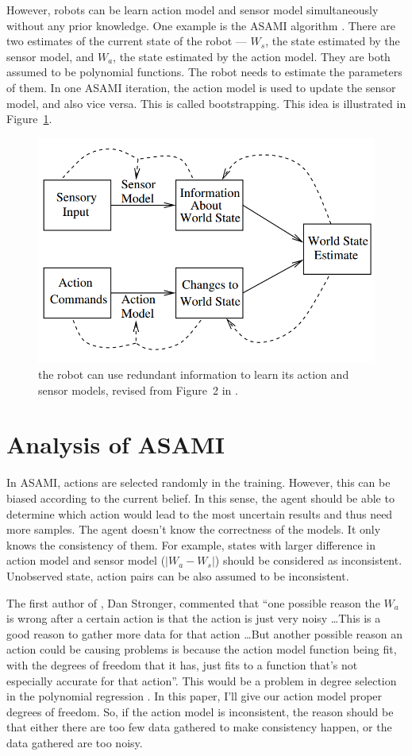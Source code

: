 \documentclass[10pt]{article}
\begin{document}
However, robots can be learn action model and sensor model
simultaneously without any prior knowledge. One example is the ASAMI
algorithm \cite{CSJ06}. There are two estimates of the current state
of the robot --- $W_s$, the state estimated by the sensor model, and
$W_a$, the state estimated by the action model. They are both assumed
to be polynomial functions. The robot needs to estimate the parameters
of them. In one ASAMI iteration, the action model is used to update
the sensor model, and also vice versa. This is called bootstrapping.
This idea is illustrated in Figure~\ref{fig:relation}.

\begin{figure}
\centering
\includegraphics[width=0.7\columnwidth]{relation.png}
\caption{the robot can use redundant information to learn its action
and sensor models, revised from Figure~2 in \cite{CSJ06}.}
\label{fig:relation}
\end{figure}

\section{Analysis of ASAMI}

In ASAMI, actions are selected randomly
in the training. However, this can be biased according to the current
belief.  In this sense, the agent should be able to determine which
action would lead to the most uncertain results and thus need more
samples.  The agent doesn't know the correctness of the models. It
only knows the consistency of them. For example, states with larger
difference in action model and sensor model ($|W_a - W_s|$) should be
considered as inconsistent.  Unobserved state, action pairs can be
also assumed to be inconsistent.

The first author of \cite{CSJ06}, Dan Stronger, commented that ``one
possible reason the $W_a$ is wrong after a certain action is that the
action is just very noisy \ldots This is a good reason to gather more
data for that action \ldots  But another possible reason  an action
could be causing problems is because the action model function being
fit, with the degrees of freedom that it has, just fits to a function
that's not especially accurate for that action''. This would be a
problem in degree selection in the polynomial regression
\cite{IJAIT08-stronger}. In this paper, I'll give our action model
proper degrees of freedom. So, if the action model is inconsistent,
the reason should be that either there are too few data gathered to
make consistency happen, or the data gathered are too noisy.
\end{document}
